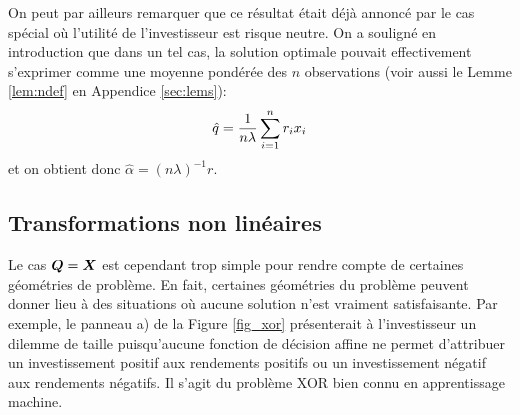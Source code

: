 On peut par ailleurs remarquer que ce résultat était déjà annoncé par le cas spécial où
l'utilité de l'investisseur est risque neutre. On a souligné en introduction que dans un
tel cas, la solution optimale pouvait effectivement s'exprimer comme une moyenne pondérée
des $n$ observations (voir aussi le Lemme \ref{lem:ndef} en Appendice \ref{sec:lems}):
\begin{equation}
  \hat q = \frac{1}{n\lambda}\sum_{i=1}^n r_i x_i
\end{equation}
et on obtient donc $\hat\alpha = (n\lambda)^{-1}r$. 



\subsection{Transformations non linéaires}

Le cas $\bm Q = \bm{X}$ est cependant trop simple pour rendre compte de certaines géométries de
problème. En fait, certaines géométries du problème peuvent donner lieu à des situations
où aucune solution n'est vraiment satisfaisante. Par exemple, le panneau a) de la Figure
\ref{fig_xor} présenterait à l'investisseur un dilemme de taille puisqu'aucune fonction de
décision affine ne permet d'attribuer un investissement positif aux rendements positifs ou
un investissement négatif aux rendements négatifs. Il s'agit du problème XOR bien connu en
apprentissage machine.


